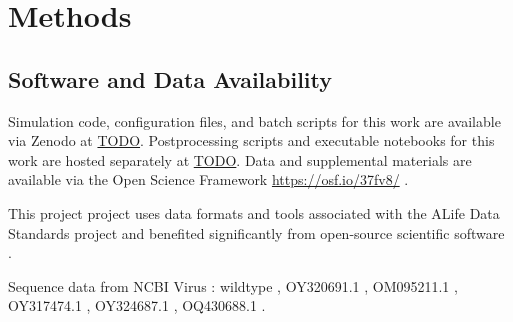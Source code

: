 \section{Methods} \label{sec:methods}

\subsection{Software and Data Availability} \label{sec:materials}

Simulation code, configuration files, and batch scripts for this work are available via Zenodo at \url{TODO}.
Postprocessing scripts and executable notebooks for this work are hosted separately at \url{TODO}.
Data and supplemental materials are available via the Open Science Framework \url{https://osf.io/37fv8/} \citep{foster2017open}.

This project project uses data formats and tools associated with the ALife Data Standards project \citep{lalejini2019data} and benefited significantly from open-source scientific software \citep{2020SciPy-NMeth,harris2020array,reback2020pandas,mckinney-proc-scipy-2010,waskom2021seaborn,hunter2007matplotlib,moreno2023teeplot,moreno2022hstrat,kerr2021covasim,dolson2024phylotrack,franceschi2024mlscluster,huertacepas2016ete3,moreno2024apc,lam2015numba,moreno2024dendropy,cock2009biopython,demaio2022phastsim}.

Sequence data from NCBI Virus \citep{brister2014ncbi}: wildtype \citep{wu2020new,MN908947.3}, OY320691.1 \citep{OY320691.1}, OM095211.1 \citep{OM095211.1}, OY317474.1 \citep{OY317474.1}, OY324687.1 \citep{OY324687.1}, OQ430688.1 \citep{OQ430688.1}.

